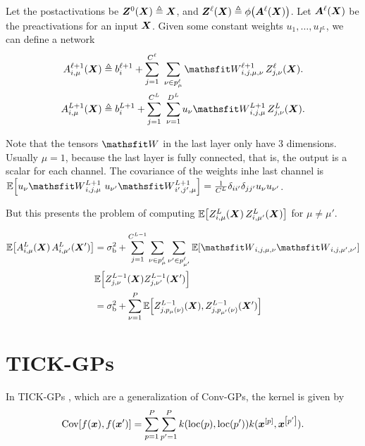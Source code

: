 \documentclass{article} %
\newcommand{\bracket}[3]{{\left#1 #3 \right#2}}
\newcommand{\bra}{\bracket{(}{)}}
\newcommand{\sqb}{\bracket{[}{]}}
\newcommand{\ssup}[1]{^{#1}}
\newcommand{\eqdef}{\triangleq}
\newcommand{\patch}[2]{{p\ssup{#1}_{#2}}}
\begin{document}
Let the postactivations be $\mZ\ssup{0}(\mX) \eqdef \mX$, and
$\mZ\ssup{\ell}(\mX) \eqdef \phi\bra{\mA\ssup{\ell}(\mX)}$. Let
$\mA\ssup{\ell}(\mX)$ be the preactivations for an input ${\bm{X}}$. Given some
constant weights ${u_1, \dots, u_{I\ssup{L}}}$, we can define a network
\begin{align}
  \emA_{i,\mu}\ssup{\ell+1}(\mX) &\eqdef \evb_i\ssup{\ell+1} +
  \sum_{j=1}^{C\ssup{\ell}} \ \sum_{\nu\in\patch{\ell}{\mu}} \etW\ssup{\ell+1}_{i,j,\mu,\nu}\, \emZ\ssup{\ell}_{j,\nu}(\mX).
  \label{eq:convgp-network-recursive} \\
  \emA_{i,\mu}\ssup{L+1}(\mX) &\eqdef \evb_i\ssup{L+1} +
                                   \sum_{j=1}^{C\ssup{L}} \ \sum_{\nu=1}^{D\ssup{L}} u_\nu \etW\ssup{L+1}_{i,j,\mu}\, \emZ\ssup{L}_{j,\nu}(\mX).
                                   \label{eq:convgp-network-final}
\end{align}

Note that the tensors $\etW$ in the last layer only have 3 dimensions. Usually
$\mu=1$, because the last layer is fully connected, that is, the output is a
scalar for each channel. The covariance of the weights inhe last channel is
$\E\sqb{u_\nu\etW\ssup{L+1}_{i,j,\mu}\ u_{\nu'}\etW\ssup{L+1}_{i',j',\mu}} =
\frac{1}{C\ssup{L}}\delta_{ii'}\delta_{jj'}\evu_\nu \evu_{\nu'}$.

But this presents the problem of computing
$\E\sqb{\emZ\ssup{L}_{i,\mu}(\mX)\, \emZ\ssup{L}_{i,\mu'}(\mX)}$ for $\mu\neq
\mu'$.

\begin{equation}
\begin{aligned}
  \E\sqb{\emA\ssup{L}_{i,\mu}(\mX)\, \emA\ssup{L}_{i,\mu'}(\mX')} &= \sigma_\text{b}^2
  + \sum_{j=1}^{C\ssup{L-1}} \sum_{\nu\in \patch{\ell}{\mu}}\sum_{\nu'\in \patch{\ell}{\mu'}} \E\sqb{\etW_{i,j,\mu,\nu} \etW_{i,j,\mu',\nu'}}\\
  &\E\sqb{Z\ssup{L-1}_{j,\nu}(\mX)Z\ssup{L-1}_{j,\nu'}(\mX')} \\
  &= \sigma_\text{b}^2 + \sum_{\nu=1}^P \E\sqb{Z\ssup{L-1}_{j,p_\mu(\nu)}(\mX), Z\ssup{L-1}_{j,p_{\mu'}(\nu)}(\mX')}
\end{aligned}
\end{equation}


\section{TICK-GPs}
In TICK-GPs \citep{dutordoir2019tick}, which are a generalization of Conv-GPs, the kernel is given by
\begin{equation}
\Cov\sqb{f(\vx), f(\vx')} = \sum_{p=1}^P\sum_{p'=1}^P k\bra{\text{loc}\bra{p}, \text{loc}\bra{p'}} k(\vx^\sqb{p}, \vx^\sqb{p'}).
\end{equation}
\end{document}
